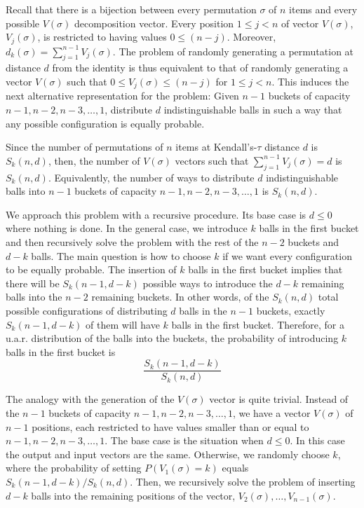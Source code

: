 \documentclass[article,nojss]{jss}
\begin{document}
Recall that there is a bijection between every permutation $\sigma$ of $n$ items and every possible $V(\sigma)$ decomposition vector. Every position $1\leq j < n$ of vector $V(\sigma)$, $V_j(\sigma)$, is restricted to having values $0\leq (n-j)$. Moreover, $d_k(\sigma) = \sum_{j=1}^{n-1}V_j(\sigma)$. The problem of randomly generating a permutation at distance $d$ from the identity is thus equivalent to that of randomly generating a vector $V(\sigma)$ such that $0 \leq V_j(\sigma) \leq (n-j)$ for  $1\leq j< n$. This induces the next alternative representation for the problem: Given $n-1$ buckets of capacity $n-1,n-2,n-3,\ldots ,1$, distribute $d$ indistinguishable balls in such a way that any possible configuration is equally probable.

Since the number of permutations of $n$ items at Kendall's-$\tau$ distance $d$ is $S_k(n,d)$, then, the number of $V(\sigma)$ vectors such that $ \sum_{j=1}^{n-1}V_j(\sigma)=d$ is $S_k(n,d)$. Equivalently, the number of ways to distribute $d$ indistinguishable balls into $n-1$ buckets of capacity $n-1,n-2,n-3,\ldots ,1$ is $S_k(n,d)$.

We approach this problem with a recursive procedure. Its base case is $d \leq 0$ where nothing is done. In the general case, we introduce $k$ balls in the first bucket and then recursively solve the problem with the rest of the $n-2$ buckets and $d-k$ balls. The main question is how to choose $k$ if we want every configuration to be equally probable. The insertion of $k$ balls in the first bucket implies that there will be $S_k(n-1, d-k)$ possible ways to introduce the $d-k$  remaining balls into the $n-2$ remaining buckets. In other words, of the $S_k(n,d)$ total possible configurations of distributing $d$ balls in the $n-1$ buckets, exactly $S_k(n-1, d-k)$ of them will have $k$ balls in the first bucket. Therefore, for a u.a.r. distribution of the balls into the buckets, the probability of introducing $k$ balls in the first bucket is
\[	\frac{S_k(n-1,d-k)}{S_k(n,d)}	\]

The analogy with the generation of the $V(\sigma)$ vector is quite trivial. Instead of the $n-1$ buckets of capacity $n-1,n-2,n-3,\ldots ,1$, we have a vector $V(\sigma)$ of $n-1$ positions, each restricted to have values smaller than or equal to $n-1,n-2,n-3,\ldots ,1$. The base case is the situation when $d \leq 0$. In this case the output and input vectors are the same. Otherwise, we randomly choose $k$, where the probability of  setting $P(V_1(\sigma)=k)$ equals $S_k(n-1,d-k)/S_k(n,d)$. Then, we recursively solve the problem of inserting $d-k$ balls into the remaining positions of the vector, $V_2(\sigma), \ldots , V_{n-1}(\sigma)$. 
\end{document}
